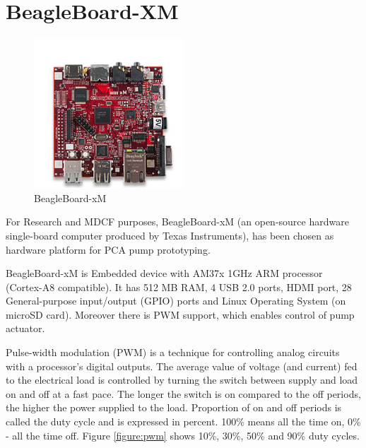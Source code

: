 \section{BeagleBoard-XM}
\label{pcapump:beagleboard}

\begin{figure}
  \begin{center}
    \includegraphics[width=0.5\textwidth]{figures/beagleboard_xm.png}
  \end{center}
  \caption{BeagleBoard-xM}
  \label{figure:beagleboard_xm}
\end{figure}

For Research and MDCF purposes, BeagleBoard-xM (an open-source hardware single-board computer produced by Texas Instruments), has been chosen as hardware platform for PCA pump prototyping.

BeagleBoard-xM is Embedded device with AM37x 1GHz ARM processor (Cortex-A8 compatible). It has 512 MB RAM, 4 USB 2.0 ports, HDMI port, 28 General-purpose input/output (GPIO) ports and Linux Operating System (on microSD card). Moreover there is PWM support, which enables control of pump actuator.

Pulse-width modulation (PWM) is a technique for controlling analog circuits with a processor's digital outputs. The average value of voltage (and current) fed to the electrical load is controlled by turning the switch between supply and load on and off at a fast pace. The longer the switch is on compared to the off periods, the higher the power supplied to the load. Proportion of on and off periods is called the duty cycle and is expressed in percent. 100\% means all the time on, 0\% - all the time off. Figure \ref{figure:pwm} shows 10\%, 30\%, 50\% and 90\% duty cycles.

